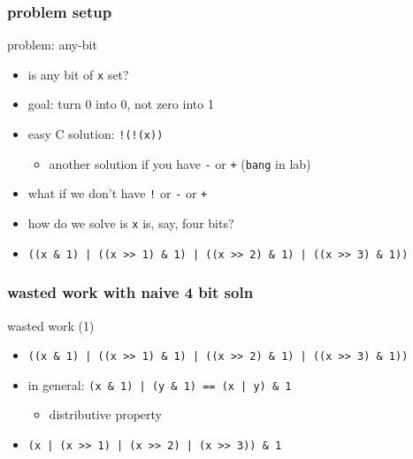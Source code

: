 \usetikzlibrary{arrows.meta,calc,circuits.logic.US,fit,matrix,positioning}

\subsubsection{problem setup}


\begin{frame}[fragile,label=anyBit]{problem: any-bit}
    \begin{itemize}
        \item is any bit of {\tt x} set?
    \item goal: turn 0 into 0, not zero into 1
    \item easy C solution: \lstinline|!(!(x))|
        \begin{itemize}
        \item another solution if you have \lstinline|-| or \lstinline|+| (\texttt{bang} in lab)
        \end{itemize}
    \item what if we don't have \lstinline|!| or \lstinline|-| or \lstinline|+|
    \vspace{.5cm}
    \item<2-> how do we solve is {\tt x} is, say, four bits?
    \item<3-> {\small\lstinline+((x & 1) | ((x >> 1) & 1) | ((x >> 2) & 1) | ((x >> 3) & 1))+}
    \end{itemize}
\end{frame}

\subsubsection{wasted work with naive 4 bit soln}

\begin{frame}[fragile,label=wastedAnyBitAnd]{wasted work (1)}
    \begin{itemize}
    \item {\small\lstinline+((x & 1) | ((x >> 1) & 1) | ((x >> 2) & 1) | ((x >> 3) & 1))+}
    \item in general: \lstinline+(x & 1) | (y & 1) == (x | y) & 1+
        \begin{itemize}
        \item distributive property
        \end{itemize}
        \vspace{.5cm}
    \item<2-> {\small\lstinline+(x | (x >> 1) | (x >> 2) | (x >> 3)) & 1+}
    \end{itemize}
\end{frame}

